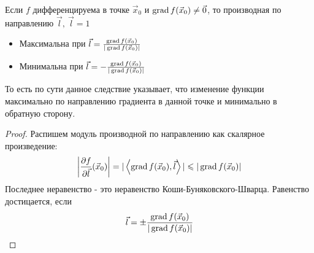 \begin{corollary}
	Если $f$ дифференцируема в точке $\vec{x}_0$ и $\operatorname{grad} f(\vec{x}_0) \neq \vec{0}$, то производная по направлению $\vec{l},\ \vec{l} = 1$
	\begin{itemize}
		\item Максимальна при $\vec{l} = \frac{\operatorname{grad} f(\vec{x}_0)}{|\operatorname{grad} f(\vec{x}_0)|}$
		
		\item Минимальна при $\vec{l} = -\frac{\operatorname{grad} f(\vec{x}_0)}{|\operatorname{grad} f(\vec{x}_0)|}$
	\end{itemize}
\end{corollary}

\begin{note}
	То есть по сути данное следствие указывает, что изменение функции максимально по направлению градиента в данной точке и минимально в обратную сторону.
\end{note}

\begin{proof}
	Распишем модуль производной по направлению как скалярное произведение:
	\[
		\left|\frac{\partial f}{\partial \vec{l}} (\vec{x}_0)\right| = |\left\langle\operatorname{grad} f(\vec{x}_0), \vec{l}\right\rangle| \leqslant |\operatorname{grad} f(\vec{x}_0)|
	\]
	Последнее неравенство - это неравенство Коши-Буняковского-Шварца. Равенство достицается, если
	\[
		\vec{l} = \pm \frac{\operatorname{grad} f(\vec{x}_0)}{|\operatorname{grad} f(\vec{x}_0)|}
	\]
\end{proof}
